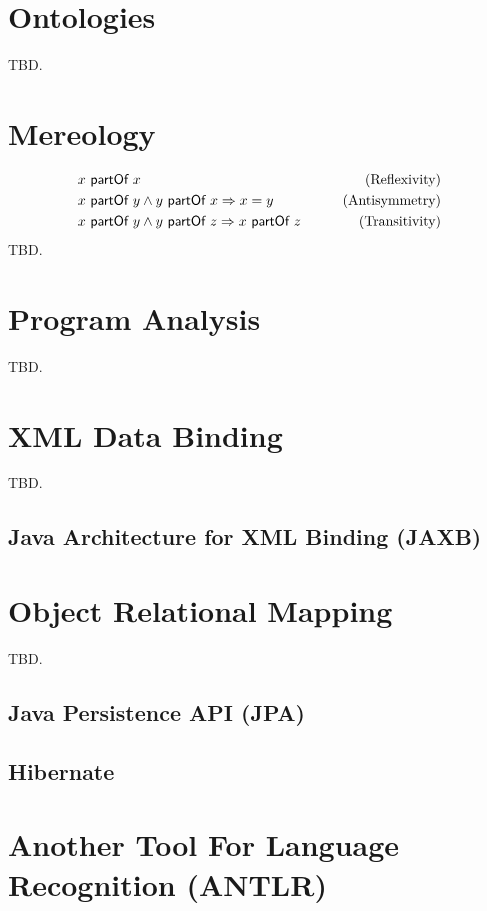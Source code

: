 \section{Ontologies}
TBD.

\section{Mereology}
\begin{align}
&x ~\textsf{partOf}~ x 
&\qquad \text{(Reflexivity)}
\\&x ~\textsf{partOf}~ y \wedge y ~\textsf{partOf}~ x \Rightarrow x = y
&\qquad \text{(Antisymmetry)}
\\&x ~\textsf{partOf}~ y \wedge y ~\textsf{partOf}~ z \Rightarrow x ~\textsf{partOf}~ z
&\qquad \text{(Transitivity)}
\end{align}
TBD.

\section{Program Analysis}
TBD.

\section{XML Data Binding}
TBD.


\subsection{Java Architecture for XML Binding (JAXB)}

\section{Object Relational Mapping}
TBD.



\subsection{Java Persistence API (JPA)}

\subsection{Hibernate}



\section{Another Tool For Language Recognition (ANTLR)}

